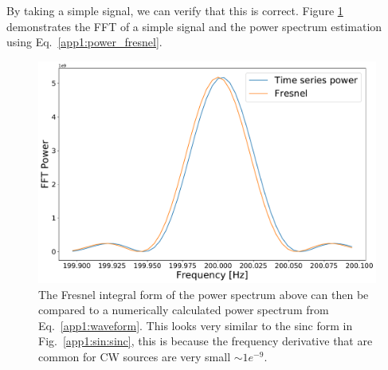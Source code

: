 By taking a simple signal, we can verify that this is correct. Figure \ref{app1:sinderivative:fresnel} demonstrates the \gls{FFT} of a simple signal and the power spectrum estimation using Eq.~\ref{app1:power_fresnel}.

\begin{figure}[ht]
	\centering
	\includegraphics[width=0.9\linewidth]{AppendixA/fresnel_fft.pdf}
	\caption[Comparison of power spectrum simulation with \gls{FFT} of sinusoid with frequency derivative.]{The Fresnel integral form of the power spectrum above can then be compared to a numerically calculated power spectrum from Eq.~\ref{app1:waveform}. This looks very similar to the sinc form in Fig.~\ref{app1:sin:sinc}, this is because the frequency derivative that are common for \gls{CW} sources are very small $\sim 1e^{-9} $.  }
	\label{app1:sinderivative:fresnel}
\end{figure}

